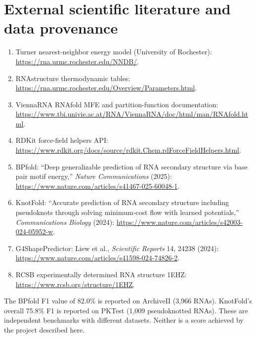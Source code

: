 \documentclass[11pt,a4paper]{article}
\begin{document}
\section{External scientific literature and data provenance}
\begin{enumerate}[leftmargin=*]
\item Turner nearest-neighbor energy model (University of Rochester): \url{https://rna.urmc.rochester.edu/NNDB/}.
\item RNAstructure thermodynamic tables: \url{https://rna.urmc.rochester.edu/Overview/Parameters.html}.
\item ViennaRNA RNAfold MFE and partition-function documentation: \url{https://www.tbi.univie.ac.at/RNA/ViennaRNA/doc/html/man/RNAfold.html}.
\item RDKit force-field helpers API: \url{https://www.rdkit.org/docs/source/rdkit.Chem.rdForceFieldHelpers.html}.
\item BPfold: ``Deep generalizable prediction of RNA secondary structure via base pair motif energy,'' \emph{Nature Communications} (2025): \url{https://www.nature.com/articles/s41467-025-60048-1}.
\item KnotFold: ``Accurate prediction of RNA secondary structure including pseudoknots through solving minimum-cost flow with learned potentials,'' \emph{Communications Biology} (2024): \url{https://www.nature.com/articles/s42003-024-05952-w}.
\item G4ShapePredictor: Liew et al., \emph{Scientific Reports} 14, 24238 (2024): \url{https://www.nature.com/articles/s41598-024-74826-2}.
\item RCSB experimentally determined RNA structure 1EHZ: \url{https://www.rcsb.org/structure/1EHZ}.
\end{enumerate}
The BPfold F1 value of 82.0\% is reported on ArchiveII (3,966 RNAs). KnotFold's overall 75.8\% F1 is reported on PKTest (1,009 pseudoknotted RNAs). These are independent benchmarks with different datasets. Neither is a score achieved by the project described here.
\end{document}
